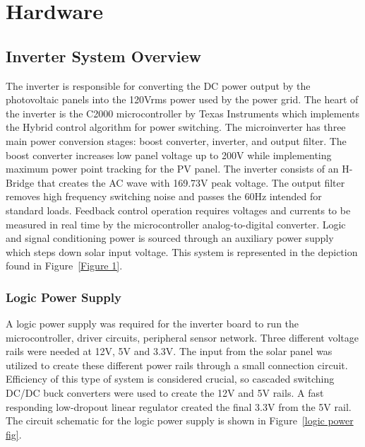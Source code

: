 
\chapter{Hardware} %

\label{Chapter2} %



\section{Inverter System Overview}

The inverter is responsible for converting the DC power output by the photovoltaic panels into the 120Vrms power used by the power grid. The heart of the inverter is the C2000 microcontroller by Texas Instruments which implements the Hybrid control algorithm for power switching. The microinverter has three main power conversion stages: boost converter, inverter, and output filter. The boost converter increases low panel voltage up to 200V while implementing maximum power point tracking for the PV panel. The inverter consists of an H-Bridge that creates the AC wave with 169.73V peak voltage. The output filter removes high frequency switching noise and passes the 60Hz intended for standard loads.  Feedback control operation requires voltages and currents to be measured in real time by the microcontroller analog-to-digital converter. Logic and signal conditioning power is sourced through an auxiliary power supply which steps down solar input voltage. This system is represented in the depiction found in Figure~\ref{Figure 1}.   

\subsection{Logic Power Supply}
A logic power supply was required for the inverter board to run the microcontroller, driver circuits, peripheral sensor network. Three different voltage rails were needed at 12V, 5V and 3.3V. The input from the solar panel was utilized to create these different power rails through a small connection circuit. Efficiency of this type of system is considered crucial, so cascaded switching DC/DC buck converters were used to create the 12V and 5V rails. A fast responding low-dropout linear regulator created the final 3.3V from the 5V rail. The circuit schematic for the logic power supply is shown in Figure~\ref{logic power fig}.

